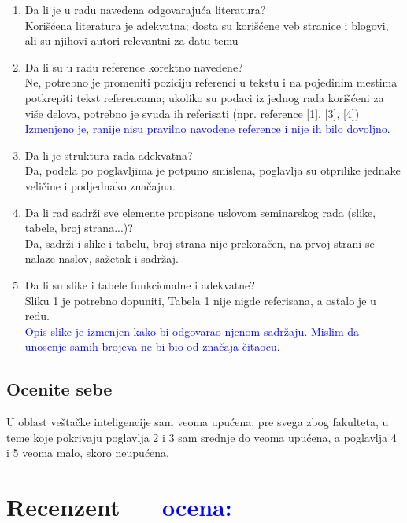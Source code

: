 \documentclass[a4paper]{report}
\newcommand{\odgovor}[1]{\textcolor{blue}{#1}}
\begin{document}
\begin{enumerate}
\item Da li je u radu navedena odgovarajuća literatura?\\
Korišćena literatura je adekvatna; dosta su korišćene veb stranice i blogovi, ali su njihovi autori relevantni za datu temu

\item Da li su u radu reference korektno navedene?\\
Ne, potrebno je promeniti poziciju referenci u tekstu i na pojedinim mestima potkrepiti tekst referencama; ukoliko su podaci iz jednog rada korišćeni za više delova, potrebno je svuda ih referisati (npr. reference [1], [3], [4])\\
\odgovor{Izmenjeno je, ranije nisu pravilno navođene reference i nije ih bilo dovoljno.}

\item Da li je struktura rada adekvatna?\\
Da, podela po poglavljima je potpuno smislena, poglavlja su otprilike jednake veličine i podjednako značajna.

\item Da li rad sadrži sve elemente propisane uslovom seminarskog rada (slike, tabele, broj strana...)?\\
Da, sadrži i slike i tabelu, broj strana nije prekoračen, na prvoj strani se nalaze naslov, sažetak i sadržaj. 

\item Da li su slike i tabele funkcionalne i adekvatne?\\
Sliku 1 je potrebno dopuniti, Tabela 1 nije nigde referisana, a ostalo je u redu. \\
\odgovor{Opis slike je izmenjen kako bi odgovarao njenom sadržaju. Mislim da unosenje samih brojeva ne bi bio od značaja čitaocu.}
\end{enumerate}

\section{Ocenite sebe}
U oblast veštačke inteligencije sam veoma upućena, pre svega zbog fakulteta, u teme koje pokrivaju poglavlja 2 i 3 sam srednje do veoma upućena, a poglavlja 4 i 5 veoma malo, skoro neupućena. 


\chapter{Recenzent \odgovor{--- ocena:} }
\end{document}
